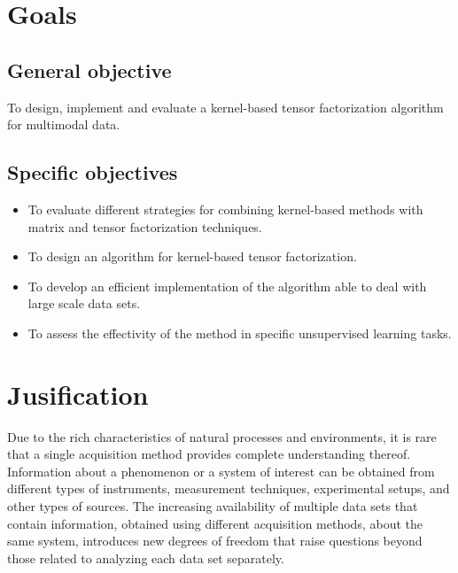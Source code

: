 \documentclass[letterpaper,12pt]{article}
\begin{document}


\section{Goals}


 \subsection*{General objective}

To design, implement and evaluate a kernel-based tensor factorization algorithm for multimodal data.
 
\subsection*{Specific objectives}

\begin{itemize}
\item To evaluate different strategies for combining kernel-based methods with matrix and tensor factorization techniques.
\item To design an algorithm for kernel-based tensor factorization.
\item To develop an efficient implementation of the algorithm able to deal with large scale data sets.
\item To assess the effectivity of the method in specific unsupervised learning tasks.
\end{itemize}


\section{Jusification}


Due to the rich characteristics of natural processes and environments, it is rare that a single acquisition method provides complete understanding thereof. Information about a phenomenon or a system of interest can be obtained from different types of instruments, measurement techniques, experimental setups, and other types of sources. The increasing availability of multiple data sets that contain information, obtained using different acquisition methods, about the same system, introduces new degrees of freedom that raise questions beyond those related to analyzing each data set separately.
\end{document}
